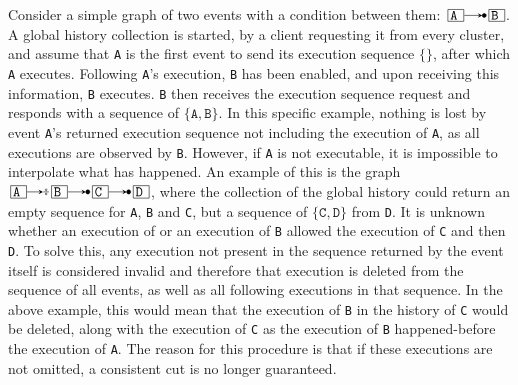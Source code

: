 \documentclass{article}
\begin{document}
	Consider a simple graph of two events with a condition between them: $\ev{A} \crel \ev{B}$.
	A global history collection is started, by a client requesting it from every cluster, and assume that \texttt{A} is the first event to send its execution sequence $\{\}$, after which \texttt{A} executes.
	Following \texttt{A}'s execution, \texttt{B} has been enabled, and upon receiving this information, \texttt{B} executes.
	\texttt{B} then receives the execution sequence request and responds with a sequence of $\{\texttt{A}, \texttt{B}\}$.
	In this specific example, nothing is lost by event \texttt{A}'s returned execution sequence not including the execution of \texttt{A}, as all executions are observed by \texttt{B}.
	However, if \texttt{A} is not executable, it is impossible to interpolate what has happened.
	An example of this is the graph $\ev{A} \erel \ev{B} \crel \ev{C} \crel \ev{D}$, where the collection of the global history could return an empty sequence for \texttt{A}, \texttt{B} and \texttt{C}, but a sequence of $\{\texttt{C}, \texttt{D}\}$ from \texttt{D}.
	It is unknown whether an execution of  or an execution of \texttt{B} allowed the execution of \texttt{C} and then \texttt{D}.
	To solve this, any execution not present in the sequence returned by the event itself is considered invalid and therefore that execution is deleted from the sequence of all events, as well as all following executions in that sequence.
	In the above example, this would mean that the execution of \texttt{B} in the history of \texttt{C} would be deleted, along with the execution of \texttt{C} as the execution of \texttt{B} happened-before the execution of \texttt{A}.
	The reason for this procedure is that if these executions are not omitted, a consistent cut is no longer guaranteed.
\end{document}
